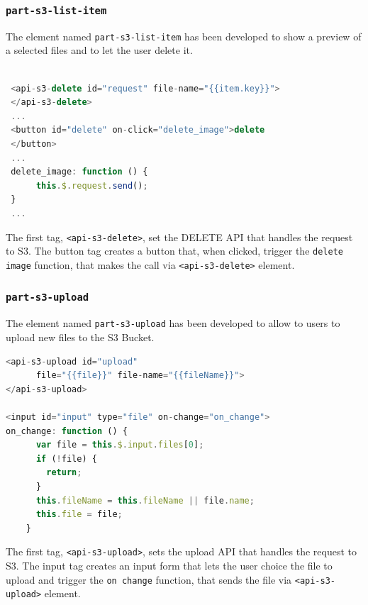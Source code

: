 \subsubsection{\texttt{part-s3-list-item}}
\label{part-s3-list-item}
The element named \texttt{part-s3-list-item} has been developed to show a preview of a selected files and to let the user delete it.
\begin{lstlisting}[language=javascript]

 <api-s3-delete id="request" file-name="{{item.key}}">
 </api-s3-delete>
 ...
 <button id="delete" on-click="delete_image">delete
 </button>
 ...
 delete_image: function () {
      this.$.request.send();
 }
 ...
\end{lstlisting}

The first tag, \texttt{<api-s3-delete>}, set the DELETE API that handles the request to S3.
The button tag creates a button that, when clicked, trigger the \texttt{delete image} function, that makes the call via \texttt{<api-s3-delete>} element.


\subsubsection{\texttt{part-s3-upload}}
\label{part-s3-upload}
The element named \texttt{part-s3-upload} has been developed to allow to users to upload new files to the S3 Bucket.

\begin{lstlisting}[language=javascript]
<api-s3-upload id="upload"
      file="{{file}}" file-name="{{fileName}}">
</api-s3-upload>

<input id="input" type="file" on-change="on_change">
on_change: function () {
      var file = this.$.input.files[0];
      if (!file) {
        return;
      }
      this.fileName = this.fileName || file.name;
      this.file = file;
    }

\end{lstlisting}

The first tag, \texttt{<api-s3-upload>}, sets the upload API that handles the request to S3.
The input tag creates an input form that lets the user choice the file to upload and trigger the \texttt{on change} function, that sends the file via \texttt{<api-s3-upload>} element.
